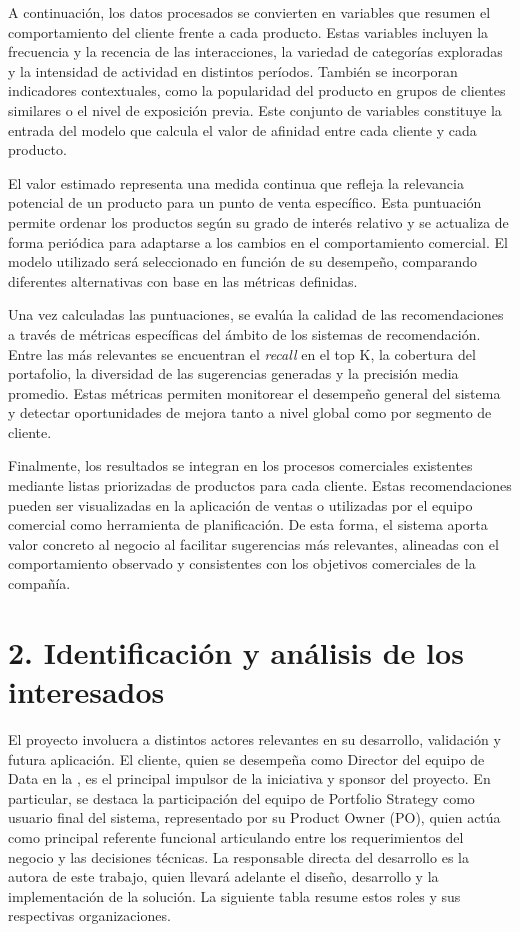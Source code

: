 \documentclass[
11pt, %
]{charter}
\begin{document}
A continuación, los datos procesados se convierten en variables que resumen el comportamiento del cliente frente a cada producto. Estas variables incluyen la frecuencia y la recencia de las interacciones, la variedad de categorías exploradas y la intensidad de actividad en distintos períodos. También se incorporan indicadores contextuales, como la popularidad del producto en grupos de clientes similares o el nivel de exposición previa. Este conjunto de variables constituye la entrada del modelo que calcula el valor de afinidad entre cada cliente y cada producto.

El valor estimado representa una medida continua que refleja la relevancia potencial de un producto para un punto de venta específico. Esta puntuación permite ordenar los productos según su grado de interés relativo y se actualiza de forma periódica para adaptarse a los cambios en el comportamiento comercial. El modelo utilizado será seleccionado en función de su desempeño, comparando diferentes alternativas con base en las métricas definidas.

Una vez calculadas las puntuaciones, se evalúa la calidad de las recomendaciones a través de métricas específicas del ámbito de los sistemas de recomendación. Entre las más relevantes se encuentran el \textit{recall} en el top K, la cobertura del portafolio, la diversidad de las sugerencias generadas y la precisión media promedio. Estas métricas permiten monitorear el desempeño general del sistema y detectar oportunidades de mejora tanto a nivel global como por segmento de cliente.

Finalmente, los resultados se integran en los procesos comerciales existentes mediante listas priorizadas de productos para cada cliente. Estas recomendaciones pueden ser visualizadas en la aplicación de ventas o utilizadas por el equipo comercial como herramienta de planificación. De esta forma, el sistema aporta valor concreto al negocio al facilitar sugerencias más relevantes, alineadas con el comportamiento observado y consistentes con los objetivos comerciales de la compañía.

\section{2. Identificación y análisis de los interesados}
\label{sec:interesados}

El proyecto involucra a distintos actores relevantes en su desarrollo, validación y futura aplicación.  El cliente, quien se desempeña como Director del equipo de Data en la \empclientename, es el principal impulsor de la iniciativa y sponsor del proyecto. En particular, se destaca la participación del equipo de Portfolio Strategy como usuario final del sistema, representado por su Product Owner (PO), quien actúa como principal referente funcional articulando entre los requerimientos del negocio y las decisiones técnicas. La responsable directa del desarrollo es la autora de este trabajo, quien llevará adelante el diseño, desarrollo y la implementación de la solución. La siguiente tabla resume estos roles y sus respectivas organizaciones.
\end{document}
